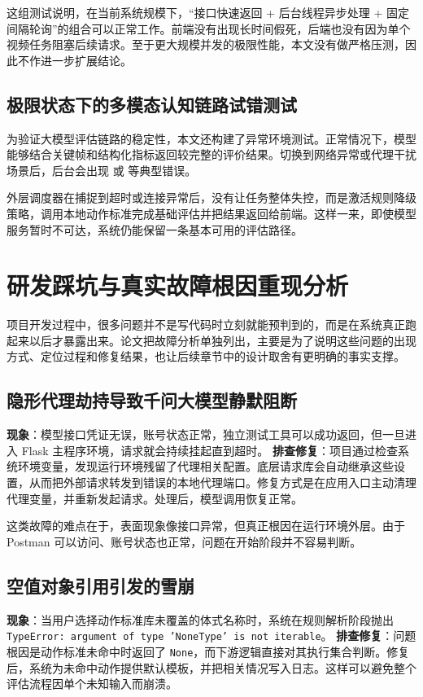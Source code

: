 \documentclass[UTF8,twoside]{ctexrep}
\makeatletter
\def@NAT@last@yr{\@citea}%
\def@NAT@last@yr{-\NAT@penalty}%
\makeatother
\begin{document}
这组测试说明，在当前系统规模下，“接口快速返回 + 后台线程异步处理 + 固定间隔轮询”的组合可以正常工作。前端没有出现长时间假死，后端也没有因为单个视频任务阻塞后续请求。至于更大规模并发的极限性能，本文没有做严格压测，因此不作进一步扩展结论。

\subsection{极限状态下的多模态认知链路试错测试}
为验证大模型评估链路的稳定性，本文还构建了异常环境测试。正常情况下，模型能够结合关键帧和结构化指标返回较完整的评价结果。切换到网络异常或代理干扰场景后，后台会出现  或  等典型错误。

外层调度器在捕捉到超时或连接异常后，没有让任务整体失控，而是激活规则降级策略，调用本地动作标准完成基础评估并把结果返回给前端。这样一来，即使模型服务暂时不可达，系统仍能保留一条基本可用的评估路径。

\section{研发踩坑与真实故障根因重现分析}

项目开发过程中，很多问题并不是写代码时立刻就能预判到的，而是在系统真正跑起来以后才暴露出来。论文把故障分析单独列出，主要是为了说明这些问题的出现方式、定位过程和修复结果，也让后续章节中的设计取舍有更明确的事实支撑。

\subsection{隐形代理劫持导致千问大模型静默阻断}
\textbf{现象}：模型接口凭证无误，账号状态正常，独立测试工具可以成功返回，但一旦进入 Flask 主程序环境，请求就会持续挂起直到超时。
\textbf{排查修复}：项目通过检查系统环境变量，发现运行环境残留了代理相关配置。底层请求库会自动继承这些设置，从而把外部请求转发到错误的本地代理端口。修复方式是在应用入口主动清理代理变量，并重新发起请求。处理后，模型调用恢复正常。

这类故障的难点在于，表面现象像接口异常，但真正根因在运行环境外层。由于 Postman 可以访问、账号状态也正常，问题在开始阶段并不容易判断。

\subsection{空值对象引用引发的雪崩}
\textbf{现象}：当用户选择动作标准库未覆盖的体式名称时，系统在规则解析阶段抛出 \texttt{TypeError: argument of type 'NoneType' is not iterable}。
\textbf{排查修复}：问题根因是动作标准未命中时返回了 \texttt{None}，而下游逻辑直接对其执行集合判断。修复后，系统为未命中动作提供默认模板，并把相关情况写入日志。这样可以避免整个评估流程因单个未知输入而崩溃。
\end{document}
